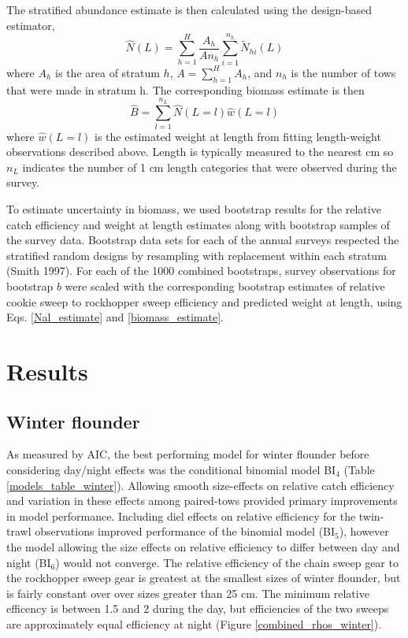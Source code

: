 \documentclass[]{article}
\begin{document}
The stratified abundance estimate is then calculated using the
design-based estimator, \begin{equation}\label{Nal_estimate}
 \widehat N(L) = \sum^H_{h=1} \frac{A_h}{An_h}\sum^{n_h}_{i=1} \widetilde N_{hi}(L)
\end{equation} where \(A_h\) is the area of stratum \(h\),
\(A=\sum^H_{h=1} A_h\), and \(n_h\) is the number of tows that were made
in stratum h. The corresponding biomass estimate is then
\begin{equation}\label{biomass_estimate}
 \widehat B = \sum^{n_L}_{l=1} \widehat N(L = l) \widehat w(L=l)
\end{equation} where \(\widehat w(L=l)\) is the estimated weight at
length from fitting length-weight observations described above. Length
is typically measured to the nearest cm so \(n_L\) indicates the number
of 1 cm length categories that were observed during the survey.

To estimate uncertainty in biomass, we used bootstrap results for the
relative catch efficiency and weight at length estimates along with
bootstrap samples of the survey data. Bootstrap data sets for each of
the annual surveys respected the stratified random designs by resampling
with replacement within each stratum (Smith 1997). For each of the 1000
combined bootstraps, survey observations for bootstrap \(b\) were scaled
with the corresponding bootstrap estimates of relative cookie sweep to
rockhopper sweep efficiency and predicted weight at length, using Eqs.
\ref{Nal_estimate} and \ref{biomass_estimate}.

\hypertarget{results}{%
\section{Results}\label{results}}

\hypertarget{winter-flounder}{%
\subsection{Winter flounder}\label{winter-flounder}}

As measured by AIC, the best performing model for winter flounder before
considering day/night effects was the conditional binomial model
BI\(_4\) (Table \ref{models_table_winter}). Allowing smooth size-effects
on relative catch efficiency and variation in these effects among
paired-tows provided primary improvements in model performance.
Including diel effects on relative efficiency for the twin-trawl
observations improved performance of the binomial model (BI\(_5\)),
however the model allowing the size effects on relative efficiency to
differ between day and night (BI\(_6\)) would not converge. The relative
efficiency of the chain sweep gear to the rockhopper sweep gear is
greatest at the smallest sizes of winter flounder, but is fairly
constant over over sizes greater than 25 cm. The minimum relative
efficency is between 1.5 and 2 during the day, but efficiencies of the
two sweeps are approximately equal efficiency at night (Figure
\ref{combined_rhos_winter}).
\end{document}
